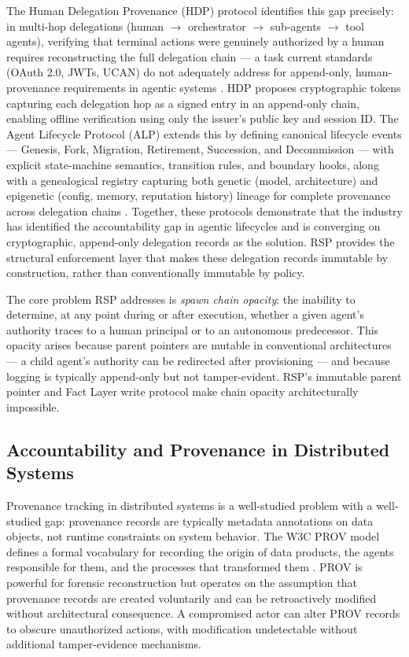 The Human Delegation Provenance (HDP) protocol identifies this gap precisely: in multi-hop delegations (human $\rightarrow$ orchestrator $\rightarrow$ sub-agents $\rightarrow$ tool agents), verifying that terminal actions were genuinely authorized by a human requires reconstructing the full delegation chain --- a task current standards (OAuth 2.0, JWTs, UCAN) do not adequately address for append-only, human-provenance requirements in agentic systems \cite{helixar2025hdp, helixar2025hdp2}. HDP proposes cryptographic tokens capturing each delegation hop as a signed entry in an append-only chain, enabling offline verification using only the issuer's public key and session ID. The Agent Lifecycle Protocol (ALP) extends this by defining canonical lifecycle events --- Genesis, Fork, Migration, Retirement, Succession, and Decommission --- with explicit state-machine semantics, transition rules, and boundary hooks, along with a genealogical registry capturing both genetic (model, architecture) and epigenetic (config, memory, reputation history) lineage for complete provenance across delegation chains \cite{alp2025}. Together, these protocols demonstrate that the industry has identified the accountability gap in agentic lifecycles and is converging on cryptographic, append-only delegation records as the solution. RSP provides the structural enforcement layer that makes these delegation records immutable by construction, rather than conventionally immutable by policy.

The core problem RSP addresses is \emph{spawn chain opacity}: the inability to determine, at any point during or after execution, whether a given agent's authority traces to a human principal or to an autonomous predecessor. This opacity arises because parent pointers are mutable in conventional architectures --- a child agent's authority can be redirected after provisioning --- and because logging is typically append-only but not tamper-evident. RSP's immutable parent pointer and Fact Layer write protocol make chain opacity architecturally impossible.

\subsection{Accountability and Provenance in Distributed Systems}

Provenance tracking in distributed systems is a well-studied problem with a well-studied gap: provenance records are typically metadata annotations on data objects, not runtime constraints on system behavior. The W3C PROV model defines a formal vocabulary for recording the origin of data products, the agents responsible for them, and the processes that transformed them \cite{moreau2015-prov}. PROV is powerful for forensic reconstruction but operates on the assumption that provenance records are created voluntarily and can be retroactively modified without architectural consequence. A compromised actor can alter PROV records to obscure unauthorized actions, with modification undetectable without additional tamper-evidence mechanisms.

